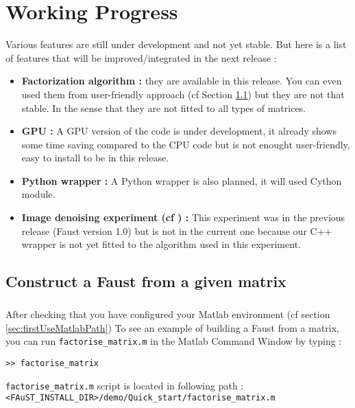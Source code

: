 \chapter{Working Progress}\label{sec:WorkingProgress}
Various features are still under development and not yet stable.
But here is a list of features that will be improved/integrated in the next release :
\begin{itemize}
	\item \textbf{Factorization algorithm : } they are available in this release. You can even used them
from user-friendly approach (cf Section \ref{sec:WorkingProgressBuildFromMatrix}) but they are not
that stable. In the sense that they are not fitted to all types of matrices.
	\item \textbf{GPU : } A GPU version of the code is under development, it already shows 
some time saving compared to the CPU code but is not enought user-friendly, easy to install to be in this release.
	\item \textbf{Python wrapper : } A Python wrapper is also planned, it will used Cython module.
	\item \textbf{Image denoising experiment (cf \cite[chapter VI.]{LeMagoarou2016}) :} This experiment was in the previous release (Faust version 1.0) 
	but is not in the current one because our C++ wrapper is not yet fitted to the algorithm used in this experiment.    
\end{itemize}

\section{Construct a Faust from a given matrix}\label{sec:WorkingProgressBuildFromMatrix}
\paragraph{}
	After checking that you have configured your Matlab environment (cf section \ref{sec:firstUseMatlabPath})  
	To see an example of building a Faust from a matrix, you can run \texttt{factorise\_matrix.m} in the Matlab Command Window by typing :
\lstset{style=customMatlab}
\begin{lstlisting}
>> factorise_matrix
\end{lstlisting}
\texttt{factorise\_matrix.m} script is located in following path :\\
\texttt{<FAuST\_INSTALL\_DIR>/demo/Quick\_start/factorise\_matrix.m} \\

